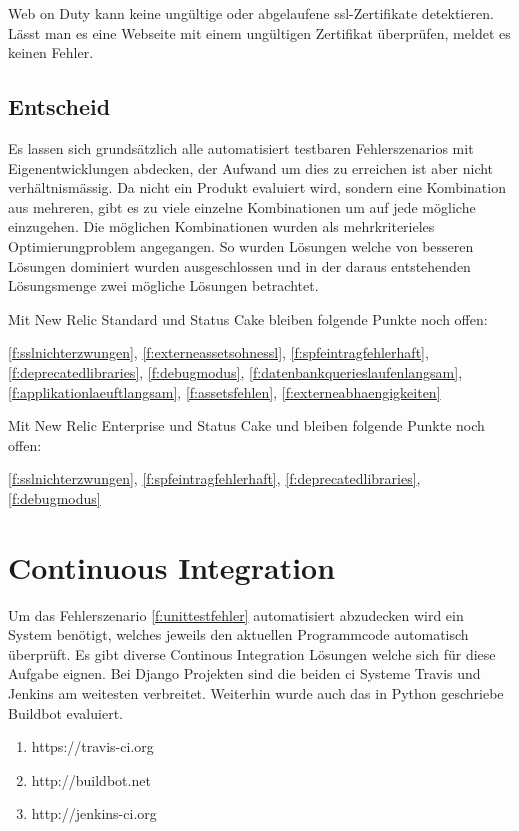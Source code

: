 Web on Duty kann keine ungültige oder abgelaufene \acrshort{ssl}-Zertifikate detektieren. Lässt man es eine Webseite mit einem ungültigen Zertifikat überprüfen, meldet es keinen Fehler.

\subsection{Entscheid}
\label{sub:entscheid_monitoring}
Es lassen sich grundsätzlich alle automatisiert testbaren Fehlerszenarios mit Eigenentwicklungen abdecken, der Aufwand um dies zu erreichen ist aber nicht verhältnismässig. Da nicht ein Produkt evaluiert wird, sondern eine Kombination aus mehreren, gibt es zu viele einzelne Kombinationen um auf jede mögliche einzugehen. Die möglichen Kombinationen wurden als mehrkriterieles Optimierungproblem angegangen. So wurden Lösungen welche von besseren Lösungen dominiert wurden ausgeschlossen und in der daraus entstehenden Lösungsmenge zwei mögliche Lösungen betrachtet.


Mit New Relic Standard und Status Cake bleiben folgende Punkte noch offen:

\ref{f:sslnichterzwungen}, \ref{f:externeassetsohnessl}, \ref{f:spfeintragfehlerhaft}, \ref{f:deprecatedlibraries}, \ref{f:debugmodus}, \ref{f:datenbankquerieslaufenlangsam}, \ref{f:applikationlaeuftlangsam}, \ref{f:assetsfehlen}, \ref{f:externeabhaengigkeiten}

Mit New Relic Enterprise und Status Cake und bleiben folgende Punkte noch offen:

\ref{f:sslnichterzwungen}, \ref{f:spfeintragfehlerhaft}, \ref{f:deprecatedlibraries}, \ref{f:debugmodus}

\section{Continuous Integration}
\label{sec:continuous_integration_evaluation}
Um das Fehlerszenario \ref{f:unittestfehler} automatisiert abzudecken wird ein System benötigt, welches jeweils den aktuellen Programmcode automatisch überprüft. Es gibt diverse Continous Integration Lösungen welche sich für diese Aufgabe eignen. Bei Django Projekten sind die beiden \acrshort{ci} Systeme Travis und Jenkins am weitesten verbreitet. Weiterhin wurde auch das in Python geschriebe Buildbot evaluiert.

\begin{enumerate}
  \item https://travis-ci.org
  \item http://buildbot.net
  \item http://jenkins-ci.org
\end{enumerate}

